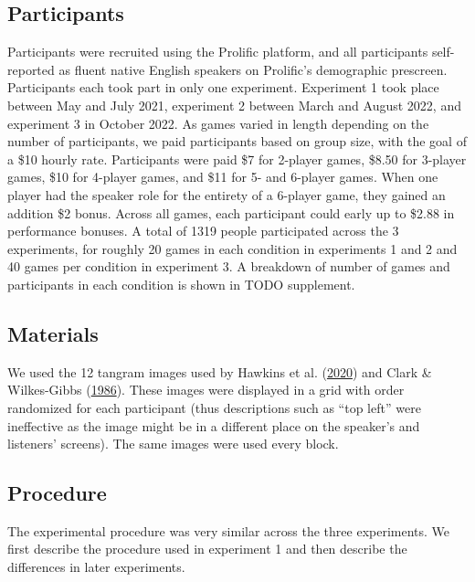 \documentclass[
  english,
  a4paper,
]{article}
\begin{document}
\hypertarget{participants}{%
\subsection{Participants}\label{participants}}

Participants were recruited using the Prolific platform, and all participants self-reported as fluent native English speakers on Prolific's demographic prescreen. Participants each took part in only one experiment. Experiment 1 took place between May and July 2021, experiment 2 between March and August 2022, and experiment 3 in October 2022. As games varied in length depending on the number of participants, we paid participants based on group size, with the goal of a \$10 hourly rate. Participants were paid \$7 for 2-player games, \$8.50 for 3-player games, \$10 for 4-player games, and \$11 for 5- and 6-player games. When one player had the speaker role for the entirety of a 6-player game, they gained an addition \$2 bonus. Across all games, each participant could early up to \$2.88 in performance bonuses. A total of 1319 people participated across the 3 experiments, for roughly 20 games in each condition in experiments 1 and 2 and 40 games per condition in experiment 3. A breakdown of number of games and participants in each condition is shown in TODO supplement.

\hypertarget{materials}{%
\subsection{Materials}\label{materials}}

We used the 12 tangram images used by Hawkins et al. (\protect\hyperlink{ref-hawkins2020}{2020}) and Clark \& Wilkes-Gibbs (\protect\hyperlink{ref-clark1986}{1986}). These images were displayed in a grid with order randomized for each participant (thus descriptions such as ``top left'' were ineffective as the image might be in a different place on the speaker's and listeners' screens). The same images were used every block.

\hypertarget{procedure}{%
\subsection{Procedure}\label{procedure}}

The experimental procedure was very similar across the three experiments. We first describe the procedure used in experiment 1 and then describe the differences in later experiments.
\end{document}
